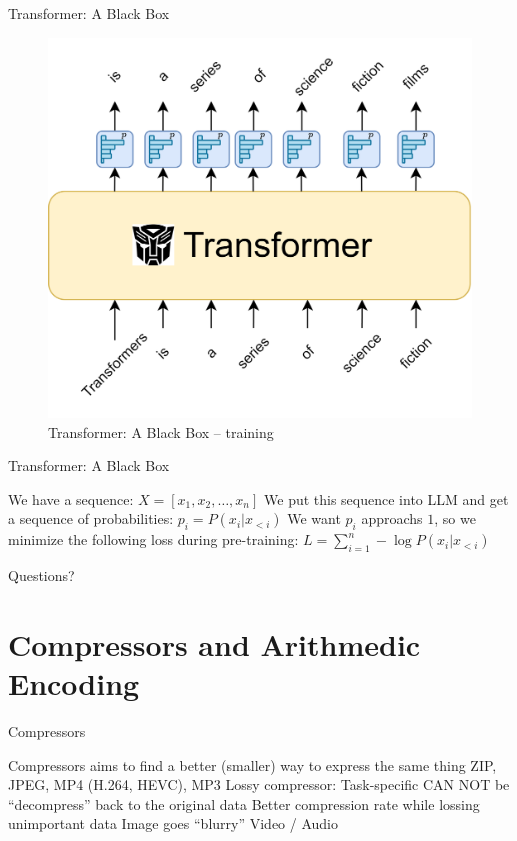 \documentclass[scheme=plain]{ctexbeamer}
\begin{document}
\begin{frame}{Transformer: A Black Box}
  \begin{figure}
      \includegraphics[width=.6\linewidth]{transformer_black_box_step_3.drawio.png}
      \caption[]{Transformer: A Black Box -- training}
  \end{figure}
\end{frame}
\begin{frame}{Transformer: A Black Box}
  \begin{outline}
    \1 We have a sequence: $ X = [x_1, x_2, \dots, x_n ] $
    \1 We put this sequence into LLM and get a sequence of probabilities:
      \2 $p_i = P(x_i | x_{<i})$
    \1 We want $p_i$ approachs $1$, so we minimize the following loss during pre-training:
      \2 $L = \sum_{i=1}^{n} - \log P(x_i | x_{<i})$
  \end{outline}
\end{frame}

\begin{frame}[standout]
  Questions?
\end{frame}

\section[Compressors and Arithmetic Encoding]{Compressors and Arithmedic Encoding}
\begin{frame}{Compressors}
  \begin{outline}
    \1 Compressors aims to find a better (smaller) way to express the same thing
    \1 ZIP, JPEG, MP4 (H.264, HEVC), MP3
    \1 Lossy compressor:
      \2 Task-specific
      \2 CAN NOT be ``decompress'' back to the original data
      \2 Better compression rate while lossing unimportant data
        \3 Image goes ``blurry''
        \3 Video / Audio
  \end{outline}
\end{frame}
\end{document}
